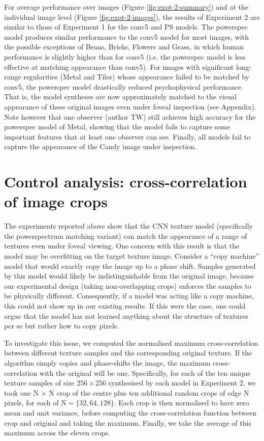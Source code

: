 \documentclass[article, 11pt,a4paper,natbib]{apa6}\usepackage[]{graphicx}\usepackage[]{color}
\begin{document}
For average performance over images (Figure \ref{fig:expt-2-summary}) and at the individual image level (Figure \ref{fig:expt-2-images}), the results of Experiment 2 are similar to those of Experiment 1 for the conv5 and PS models.
The powerspec model produces similar performance to the conv5 model for most images, with the possible exceptions of Beans, Bricks, Flowers and Grass, in which human performance is slightly higher than for conv5 (i.e. the powerspec model is less effective at matching appearance than conv5). 
For images with significant long-range regularities (Metal and Tiles) whose appearance failed to be matched by conv5, the powerspec model drastically reduced psychophysical performance.
That is, the model syntheses are now approximately matched to the visual appearance of these original images even under foveal inspection (see Appendix).
Note however that one observer (author TW) still achieves high accuracy for the powerspec model of Metal, showing that the model fails to capture some important features that at least one observer can see.
Finally, all models fail to capture the appearance of the Candy image under inspection.

\section{Control analysis: cross-correlation of image crops}

The experiments reported above show that the CNN texture model (specifically the powerspectrum matching variant) can match the appearance of a range of textures even under foveal viewing.
One concern with this result is that the model may be overfitting on the target texture image.
Consider a ``copy machine'' model that would exactly copy the image up to a phase shift.
Samples generated by this model would likely be indistinguishable from the original image, because our experimental design (taking non-overlapping crops) enforces the samples to be physically different. 
Consequently, if a model was acting like a copy machine, this could not show up in our existing results.
If this were the case, one could argue that the model has not learned anything about the structure of textures per se but rather how to copy pixels.

To investigate this issue, we computed the normalised maximum cross-correlation between different texture samples and the corresponding original texture. 
If the algorithm simply copies and phase-shifts the image, the maximum cross-correlation with the original will be one.
Specifically, for each of the ten unique texture samples of size $256 \times 256$ synthesised by each model in Experiment 2, we took 
one N $\times$ N crop of the centre plus ten additional random crops of edge N pixels, for each of $\mathrm{N} = \{32, 64, 128\}$.
Each crop is then normalised to have zero mean and unit variance, before computing the cross-correlation function between crop and original and taking the maximum.
Finally, we take the average of this maximum across the eleven crops.
\end{document}
